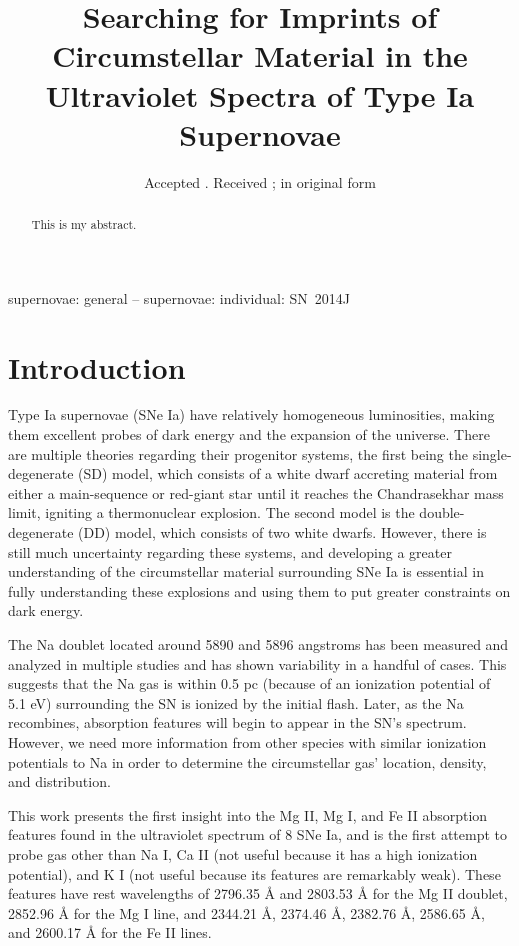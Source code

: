 \documentclass[useAMS,usenatbib]{mn2e}
\title[SN~Ia UV CSM]{Searching for Imprints of Circumstellar Material in the Ultraviolet Spectra of Type Ia Supernovae}
\author[Beaudoin et~al.]{Aaron~Beaudoin$^{\illast,\illphys}$\thanks{E-mail:beaudoi1@illinois.edu},
Ryan~J.~Foley$^{\illast,\illphys}\\
$^{\illast}$Astronomy Department, University of Illinois at Urbana--Champaign, 1002 W.\ Green Street, Urbana, IL 61801, USA\\
$^{\illphys}$Department of Physics, University of Illinois Urbana--Champaign, 1110 W.\ Green Street, Urbana, IL 61801, USA}
\begin{document}
\date{Accepted  . Received   ; in original form  }
\pagerange{\pageref{firstpage}--\pageref{lastpage}} 
\maketitle
\label{firstpage}

\begin{abstract}
This is my abstract.
\end{abstract}

\begin{keywords}
  {supernovae: general -- supernovae: individual: SN~2014J}
\end{keywords}



\section{Introduction}\label{s:intro}

    Type Ia supernovae (SNe Ia) have relatively homogeneous luminosities, making them excellent probes of dark energy and the expansion of the universe. There are multiple theories regarding their progenitor systems, the first being the single-degenerate (SD) model, which consists of a white dwarf accreting material from either a main-sequence or red-giant star until it reaches the Chandrasekhar mass limit, igniting a thermonuclear explosion. The second model is the double-degenerate (DD) model, which consists of two white dwarfs. However, there is still much uncertainty regarding these systems, and developing a greater understanding of the circumstellar material surrounding SNe Ia is essential in fully understanding these explosions and using them to put greater constraints on dark energy.

    The Na doublet located around 5890 and 5896 angstroms has been measured and analyzed in multiple studies and has shown variability in a handful of cases. This suggests that the Na gas is within 0.5 pc (because of an ionization potential of 5.1 eV) surrounding the SN is ionized by the initial flash. Later, as the Na recombines, absorption features will begin to appear in the SN’s spectrum. However, we need more information from other species with similar ionization potentials to Na in order to determine the circumstellar gas’ location, density, and distribution.

    This work presents the first insight into the Mg II, Mg I, and Fe II absorption features found in the ultraviolet spectrum of 8 SNe Ia, and is the first attempt to probe gas other than Na I, Ca II (not useful because it has a high ionization potential), and K I (not useful because its features are remarkably weak). These features have rest wavelengths of 2796.35 Å and 2803.53 Å for the Mg II doublet, 2852.96 Å for the Mg I line, and 2344.21 Å, 2374.46 Å, 2382.76 Å, 2586.65 Å, and 2600.17 Å for the Fe II lines.
\end{document}
